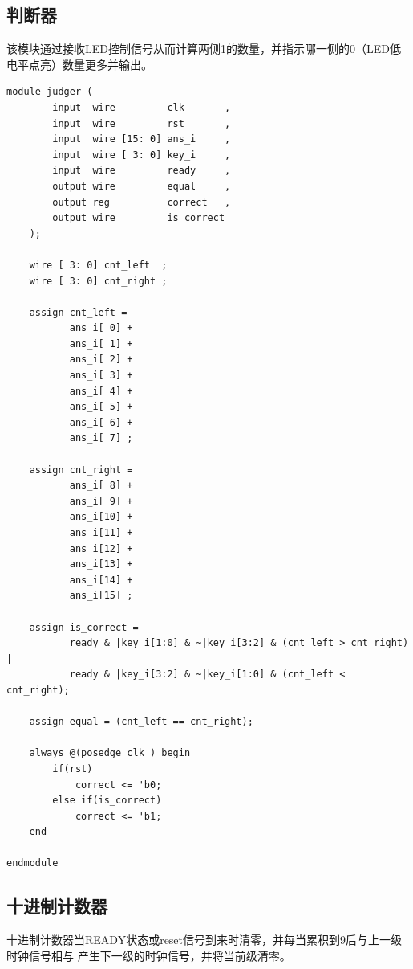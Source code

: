 \subsection{判断器}
该模块通过接收LED控制信号从而计算两侧1的数量，并指示哪一侧的0（LED低电平点亮）数量更多并输出。
\begin{lstlisting}
module judger (
        input  wire         clk       ,
        input  wire         rst       ,
        input  wire [15: 0] ans_i     ,
        input  wire [ 3: 0] key_i     ,
        input  wire         ready     ,
        output wire         equal     ,
        output reg          correct   ,
        output wire         is_correct
    );

    wire [ 3: 0] cnt_left  ;
    wire [ 3: 0] cnt_right ;

    assign cnt_left =
           ans_i[ 0] +
           ans_i[ 1] +
           ans_i[ 2] +
           ans_i[ 3] +
           ans_i[ 4] +
           ans_i[ 5] +
           ans_i[ 6] +
           ans_i[ 7] ;

    assign cnt_right =
           ans_i[ 8] +
           ans_i[ 9] +
           ans_i[10] +
           ans_i[11] +
           ans_i[12] +
           ans_i[13] +
           ans_i[14] +
           ans_i[15] ;

    assign is_correct =
           ready & |key_i[1:0] & ~|key_i[3:2] & (cnt_left > cnt_right) |
           ready & |key_i[3:2] & ~|key_i[1:0] & (cnt_left < cnt_right);

    assign equal = (cnt_left == cnt_right);

    always @(posedge clk ) begin
        if(rst)
            correct <= 'b0;
        else if(is_correct)
            correct <= 'b1;
    end

endmodule
\end{lstlisting}


\subsection{十进制计数器}
十进制计数器当READY状态或reset信号到来时清零，并每当累积到9后与上一级时钟信号相与
产生下一级的时钟信号，并将当前级清零。

